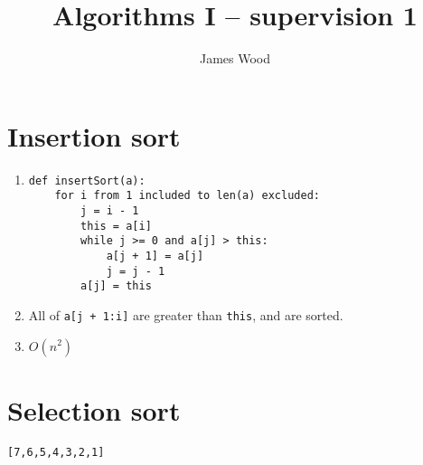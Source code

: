 \documentclass[11pt]{article}
\title{\textbf{Algorithms I -- supervision 1}}
\author{James Wood}
\begin{document}
\maketitle

\section{Insertion sort}
\begin{enumerate}
  \item
    \begin{minipage}[t]{\linewidth}
      \begin{lstlisting}
def insertSort(a):
    for i from 1 included to len(a) excluded:
        j = i - 1
        this = a[i]
        while j >= 0 and a[j] > this:
            a[j + 1] = a[j]
            j = j - 1
        a[j] = this
      \end{lstlisting}
    \end{minipage}
  \item All of \texttt{a[j + 1:i]} are greater than \texttt{this}, and are sorted.
  \item \(O(n^2)\)
\end{enumerate}

\section{Selection sort}
\texttt{[7,6,5,4,3,2,1]}
\end{document}
